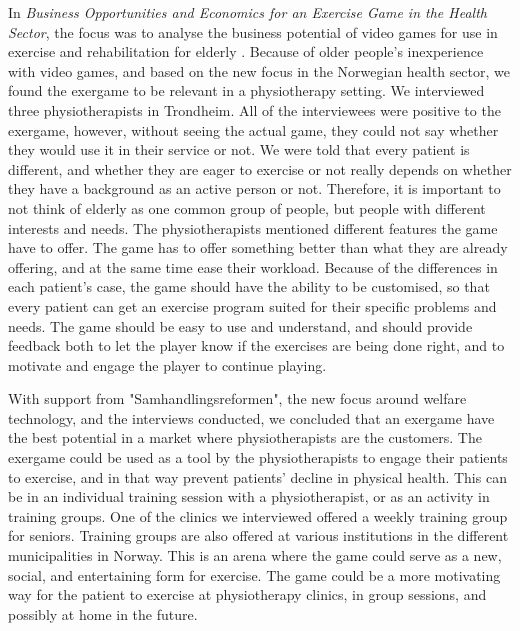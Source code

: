 In \emph{Business Opportunities and Economics for an Exercise Game in the Health Sector}, the focus was to analyse the business potential of video games for use in exercise and rehabilitation for elderly \cite{project}.  Because of older people's inexperience with video games, and based on the new focus in the Norwegian health sector, we found the exergame to be relevant in a physiotherapy setting. We interviewed three physiotherapists in Trondheim. All of the interviewees were positive to the exergame, however, without seeing the actual game, they could not say whether they would use it in their service or not. We were told that every patient is different, and whether they are eager to exercise or not really depends on whether they have a background as an active person or not. Therefore, it is important to not think of elderly as one common group of people, but people with different interests and needs. The physiotherapists mentioned different features the game have to offer. The game has to offer something better than what they are already offering, and at the same time ease their workload. Because of the differences in each patient's case, the game should have the ability to be customised, so that every patient can get an exercise program suited for their specific problems and needs. The game should be easy to use and understand, and should provide feedback both to let the player know if the exercises are being done right, and to motivate and engage the player to continue playing. 

With support from "Samhandlingsreformen", the new focus around welfare technology, and the interviews conducted, we concluded that an exergame have the best potential in a market where physiotherapists are the customers. The exergame could be used as a tool by the physiotherapists to engage their patients to exercise, and in that way prevent patients' decline in physical health. This can be in an individual training session with a physiotherapist, or as an activity in training groups. One of the clinics we interviewed offered a weekly training group for seniors. Training groups are also offered at various institutions in the different municipalities in Norway. This is an arena where the game could serve as a new, social, and entertaining form for exercise. The game could be a more motivating way for the patient to exercise at physiotherapy clinics, in group sessions, and possibly at home in the future. 

